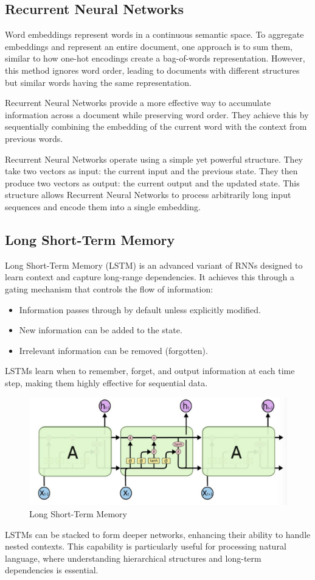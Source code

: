 \subsection{Recurrent Neural Networks}
Word embeddings represent words in a continuous semantic space. 
To aggregate embeddings and represent an entire document, one approach is to sum them, similar to how one-hot encodings create a bag-of-words representation. 
However, this method ignores word order, leading to documents with different structures but similar words having the same representation.

Recurrent Neural Networks provide a more effective way to accumulate information across a document while preserving word order. 
They achieve this by sequentially combining the embedding of the current word with the context from previous words.

Recurrent Neural Networks operate using a simple yet powerful structure. 
They take two vectors as input: the current input and the previous state. 
They then produce two vectors as output: the current output and the updated state. 
This structure allows Recurrent Neural Networks to process arbitrarily long input sequences and encode them into a single embedding.

\subsection{Long Short-Term Memory}
Long Short-Term Memory (LSTM) is an advanced variant of RNNs designed to learn context and capture long-range dependencies. 
It achieves this through a gating mechanism that controls the flow of information:
\begin{itemize}
    \item Information passes through by default unless explicitly modified.
    \item New information can be added to the state.
    \item Irrelevant information can be removed (forgotten).
\end{itemize}
\noindent LSTMs learn when to remember, forget, and output information at each time step, making them highly effective for sequential data.
\begin{figure}[H]
    \centering
    \includegraphics[width=0.5\linewidth]{images/nlp1.png}
    \caption{Long Short-Term Memory}
\end{figure}
LSTMs can be stacked to form deeper networks, enhancing their ability to handle nested contexts. 
This capability is particularly useful for processing natural language, where understanding hierarchical structures and long-term dependencies is essential.

